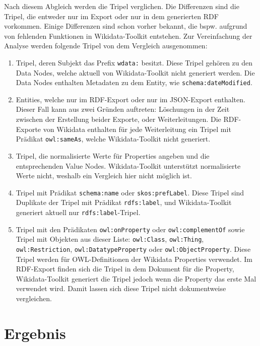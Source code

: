 Nach diesem Abgleich werden die Tripel verglichen.
Die Differenzen sind die Tripel, die entweder nur im Export oder nur in dem generierten RDF vorkommen.
Einige Differenzen sind schon vorher bekannt, die bspw. aufgrund von fehlenden Funktionen in Wikidata-Toolkit entstehen.
Zur Vereinfachung der Analyse werden folgende Tripel von dem Vergleich ausgenommen:
\begin{enumerate}
\item Tripel, deren Subjekt das Prefix \verb|wdata:| besitzt. Diese Tripel gehören zu den Data Nodes, welche aktuell von Wikidata-Toolkit nicht generiert werden.
Die Data Nodes enthalten Metadaten zu dem Entity, wie \verb|schema:dateModified|.
\item Entities, welche nur im RDF-Export oder nur im JSON-Export enthalten. Dieser Fall kann aus zwei Gründen auftreten: Löschungen in der Zeit zwischen der Erstellung beider Exporte, oder Weiterleitungen.
  Die RDF-Exporte von Wikidata enthalten für jede Weiterleitung ein Tripel mit Prädikat \verb|owl:sameAs|, welche Wikidata-Toolkit nicht generiert.
\item Tripel, die normalisierte Werte für Properties angeben und die entsprechenden Value Nodes. Wikidata-Toolkit unterstützt normalisierte Werte nicht, weshalb ein Vergleich hier nicht möglich ist.
\item Tripel mit Prädikat \verb|schema:name| oder \verb|skos:prefLabel|. Diese Tripel sind Duplikate der Tripel mit Prädikat \verb|rdfs:label|, und Wikidata-Toolkit generiert aktuell nur \verb|rdfs:label|-Tripel.
\item Tripel mit den Prädikaten \verb|owl:onProperty| oder \verb|owl:complementOf| sowie Tripel mit Objekten aus dieser Liste: \verb|owl:Class|, \verb|owl:Thing|, \verb|owl:Restriction|, \verb|owl:DatatypeProperty| oder \verb|owl:ObjectProperty|. Diese Tripel werden für OWL-Definitionen der Wikidata Properties verwendet.
Im RDF-Export finden sich die Tripel in dem Dokument für die Property, Wikidata-Toolkit generiert die Tripel jedoch wenn die Property das erste Mal verwendet wird. Damit lassen sich diese Tripel nicht dokumentweise vergleichen.
\end{enumerate}

\section{Ergebnis} 

